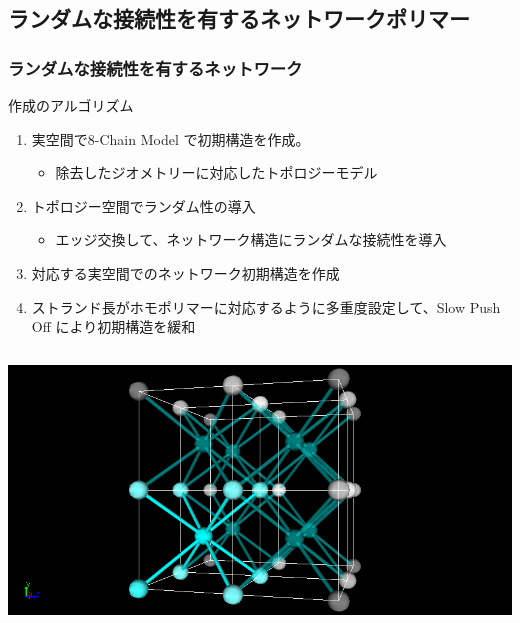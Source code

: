 \documentclass[12pt, dvipdfmx]{beamer}
\begin{document}
\subsection{ランダムな接続性を有するネットワークポリマー}
\begin{frame}
	\frametitle{ランダムな接続性を有するネットワーク}
	\vspace{-1mm}
		\begin{exampleblock}{作成のアルゴリズム}
			\begin{enumerate}
				\item \alert{実空間}で8-Chain Model で初期構造を作成。
					\begin{itemize}
						\item 除去したジオメトリーに対応した\alert{トポロジーモデル}
					\end{itemize}
				\item トポロジー空間でランダム性の導入
					\begin{itemize}
						\item \alert{エッジ交換}して、ネットワーク構造にランダムな接続性を導入
					\end{itemize}	
				\item 対応する\alert{実空間でのネットワーク初期構造}を作成
				\item ストランド長がホモポリマーに対応するように多重度設定して、Slow Push Off により初期構造を緩和
			\end{enumerate}
		\end{exampleblock}
		\vspace{-1mm}
		\begin{columns}[T, onlytextwidth]
				\includegraphics[width=\textwidth]{8_per.png}

\end{columns}
\end{frame}
\end{document}
